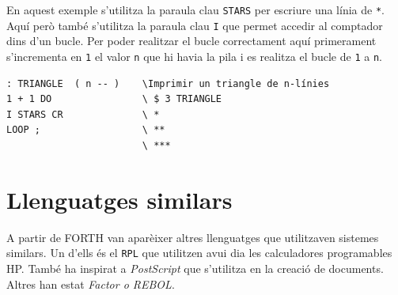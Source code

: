 \documentclass{article}
\begin{document}
En aquest exemple s'utilitza la paraula clau \texttt{STARS} per escriure una línia de \texttt{*}. Aquí però també s'utilitza la paraula clau \texttt{I} que permet accedir al comptador dins d'un bucle. Per poder realitzar el bucle correctament aquí primerament s'incrementa en \texttt{1} el valor \texttt{n} que hi havia la pila i es realitza el bucle de \texttt{1} a \texttt{n}.
\begin{lstlisting}[frame=single]
: TRIANGLE  ( n -- )    \Imprimir un triangle de n-línies
1 + 1 DO              	\ $ 3 TRIANGLE
I STARS CR            	\ *
LOOP ;                	\ **
						\ ***
\end{lstlisting}

\section{Llenguatges similars}
A partir de FORTH van aparèixer altres llenguatges que utilitzaven sistemes similars. Un d'ells és el \texttt{RPL} que utilitzen avui dia les calculadores programables HP. També ha inspirat a \emph{PostScript} que s'utilitza en la creació de documents. Altres han estat \emph{Factor o REBOL}.

\printbibliography
\end{document}
